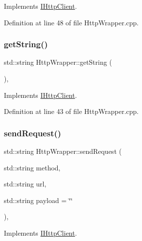 Implements \hyperlink{class_i_http_client_a7e7b1f6846e06a81242fbfdb2e328016}{I\+Http\+Client}.



Definition at line 48 of file Http\+Wrapper.\+cpp.

\mbox{\label{class_http_wrapper_a4c821b412205cfc46421b06e29a53f4f}} 
\subsubsection{\texorpdfstring{get\+String()}{getString()}}
{\footnotesize\ttfamily std\+::string Http\+Wrapper\+::get\+String (\begin{DoxyParamCaption}{ }\end{DoxyParamCaption})\hspace{0.3cm}{\ttfamily [override]}, {\ttfamily [virtual]}}



Implements \hyperlink{class_i_http_client_a3bf91f2161617983a11228fdc69298b8}{I\+Http\+Client}.



Definition at line 43 of file Http\+Wrapper.\+cpp.

\mbox{\label{class_http_wrapper_ab80e5851ce58d7d820dba5f13bb14fa1}} 
\subsubsection{\texorpdfstring{send\+Request()}{sendRequest()}}
{\footnotesize\ttfamily std\+::string Http\+Wrapper\+::send\+Request (\begin{DoxyParamCaption}\item[{std\+::string}]{method,  }\item[{std\+::string}]{url,  }\item[{std\+::string}]{payload = {\ttfamily \char`\"{}\char`\"{}} }\end{DoxyParamCaption})\hspace{0.3cm}{\ttfamily [override]}, {\ttfamily [virtual]}}



Implements \hyperlink{class_i_http_client_accb015ba9ef2b7963f13094297d97073}{I\+Http\+Client}.



